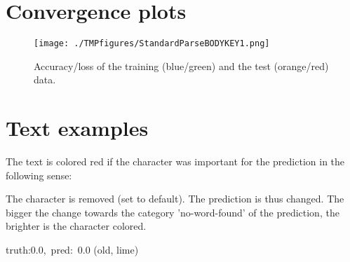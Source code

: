 \documentclass[a4paper,10pt,twoside]{article}
\begin{document}
        \section{Convergence plots}
\begin{figure}[H]
\begin{center}
\texttt{[image: ./TMPfigures/StandardParseBODYKEY1.png]}
\end{center}
\caption{Accuracy/loss of the training (blue/green) and the test (orange/red) data.}
\end{figure}
\section{Text examples}
The text is colored red if the character was important for the prediction in the following sense:


    The character is removed (set to default). The prediction is thus changed. 
    The bigger the change towards the category 'no-word-found' of the prediction, the brighter is the character colored. 
    \vspace{1cm}
    


    

 {\footnotesize {\color[rgb]{0.6, 0.6, 0.6}truth:0.0,~pred:~0.0}} (old, lime)\hrulefill
\end{document}
